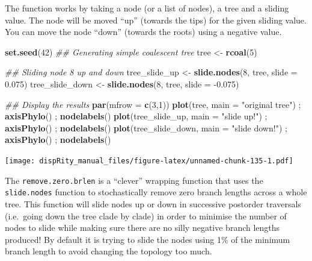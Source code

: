 \documentclass[]{book}
\newenvironment{Shaded}{\begin{snugshade}}{\end{snugshade}}
\newcommand{\CommentTok}[1]{\textcolor[rgb]{0.56,0.35,0.01}{\textit{#1}}}
\newcommand{\DataTypeTok}[1]{\textcolor[rgb]{0.13,0.29,0.53}{#1}}
\newcommand{\DecValTok}[1]{\textcolor[rgb]{0.00,0.00,0.81}{#1}}
\newcommand{\FloatTok}[1]{\textcolor[rgb]{0.00,0.00,0.81}{#1}}
\newcommand{\KeywordTok}[1]{\textcolor[rgb]{0.13,0.29,0.53}{\textbf{#1}}}
\newcommand{\NormalTok}[1]{#1}
\newcommand{\StringTok}[1]{\textcolor[rgb]{0.31,0.60,0.02}{#1}}
\begin{document}
The function works by taking a node (or a list of nodes), a tree and a sliding value.
The node will be moved ``up'' (towards the tips) for the given sliding value.
You can move the node ``down'' (towards the roots) using a negative value.

\begin{Shaded}
\begin{Highlighting}[]
\KeywordTok{set.seed}\NormalTok{(}\DecValTok{42}\NormalTok{)}
\CommentTok{## Generating simple coalescent tree}
\NormalTok{tree <-}\StringTok{ }\KeywordTok{rcoal}\NormalTok{(}\DecValTok{5}\NormalTok{)}

\CommentTok{## Sliding node 8 up and down}
\NormalTok{tree_slide_up <-}\StringTok{ }\KeywordTok{slide.nodes}\NormalTok{(}\DecValTok{8}\NormalTok{, tree, }\DataTypeTok{slide =} \FloatTok{0.075}\NormalTok{)}
\NormalTok{tree_slide_down <-}\StringTok{ }\KeywordTok{slide.nodes}\NormalTok{(}\DecValTok{8}\NormalTok{, tree, }\DataTypeTok{slide =} \FloatTok{-0.075}\NormalTok{)}

\CommentTok{## Display the results}
\KeywordTok{par}\NormalTok{(}\DataTypeTok{mfrow =} \KeywordTok{c}\NormalTok{(}\DecValTok{3}\NormalTok{,}\DecValTok{1}\NormalTok{))}
\KeywordTok{plot}\NormalTok{(tree, }\DataTypeTok{main =} \StringTok{"original tree"}\NormalTok{) ; }\KeywordTok{axisPhylo}\NormalTok{() ; }\KeywordTok{nodelabels}\NormalTok{()}
\KeywordTok{plot}\NormalTok{(tree_slide_up, }\DataTypeTok{main =} \StringTok{"slide up!"}\NormalTok{) ; }\KeywordTok{axisPhylo}\NormalTok{() ; }\KeywordTok{nodelabels}\NormalTok{()}
\KeywordTok{plot}\NormalTok{(tree_slide_down, }\DataTypeTok{main =} \StringTok{"slide down!"}\NormalTok{) ; }\KeywordTok{axisPhylo}\NormalTok{() ; }\KeywordTok{nodelabels}\NormalTok{()}
\end{Highlighting}
\end{Shaded}

\texttt{[image: dispRity\_manual\_files/figure-latex/unnamed-chunk-135-1.pdf]}

The \texttt{remove.zero.brlen} is a ``clever'' wrapping function that uses the \texttt{slide.nodes} function to stochastically remove zero branch lengths across a whole tree.
This function will slide nodes up or down in successive postorder traversals (i.e.~going down the tree clade by clade) in order to minimise the number of nodes to slide while making sure there are no silly negative branch lengths produced!
By default it is trying to slide the nodes using 1\% of the minimum branch length to avoid changing the topology too much.
\end{document}
